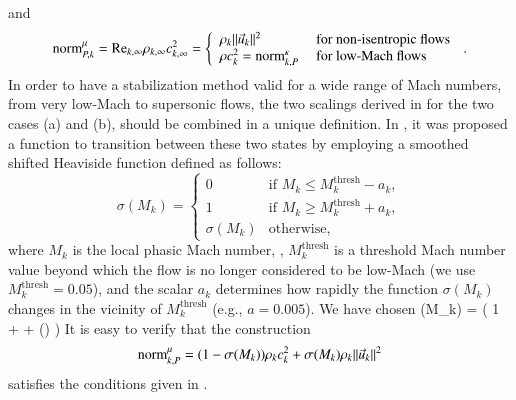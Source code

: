 \documentclass[preprint,10pt]{elsarticle}
\begin{document}
%
and
%
\begin{equation}
\label{eq:norm_ent2}
\textrm{norm}_{P,k}^\mu = \textrm{Re}_{k,\infty} \rho_{k,\infty} c_{k,\infty}^2 =  \left\{
\begin{array}{ll}
 \rho_k \|\vec{u}_k \|^2       & \text{ for non-isentropic flows} \\
 \rho c_k^2 = \textrm{norm}_{k,P}^\kappa & \text{ for low-Mach flows}
\end{array}
\right. \,.
\end{equation}
%
In order to have a stabilization method 
valid for a wide range of Mach numbers, from very low-Mach to supersonic flows, the two scalings derived in  for the two cases (a) and (b), should 
be combined in a unique definition. 
%
In \cite{DelchiniCompFluid2014-euler}, it was proposed a function to transition between these two states by employing a smoothed shifted Heaviside function
defined as follows: %
\begin{equation}
\sigma(M_k) =
\left\{
\begin{array}{ll}
0 & \text{if } M_k \le M_k^\text{thresh} - a_k, \\
1 & \text{if } M_k \ge M_k^\text{thresh} + a_k, \\
\sigma(M_k)   & \text{otherwise,}
\end{array}
\right.
\end{equation}
where $M_k$ is the local phasic Mach number, , $M_k^\text{thresh}$ is a threshold Mach number value beyond which the flow is no longer 
considered to be low-Mach (we use $M_k^\text{thresh}=0.05$), and the scalar $a_k$ determines how rapidly the function $\sigma(M_k)$ 
changes in the vicinity of $M_k^\text{thresh}$ (e.g., $a = 0.005$). We have chosen
\be\label{eq:fct-sigma}
\sigma(M_k) =  \left( 1 +  +  \sin \left(\right) \right) 
\ee
It is easy to verify that the construction
\begin{equation}
\label{eq:norm_ent3}
\textrm{norm}_{k,P}^\mu = (1-\sigma(M_k)) \rho_k c_k^2  + \sigma(M_k)  \rho_k \|\vec{u}_k \|^2  
\end{equation}
satisfies the conditions given in .
%
\end{document}
